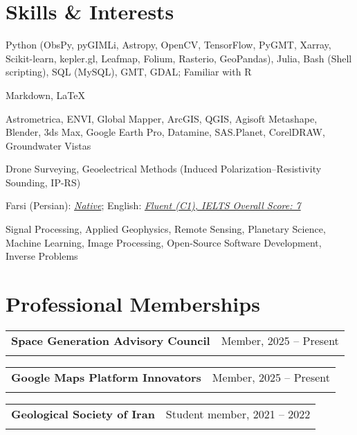 \documentclass[letterpaper,11pt]{article}
\makeatletter
\newcommand{\ressubheading}[4]{%
	\begin{tabular*}{\textwidth}{l@{\cftdotfill{\cftsecdotsep}\extracolsep{\fill}}r}
		\textbf{#1} & #2 \\
		\textit{#3} & \textit{#4} \\
	\end{tabular*}\vspace{-8pt}
}
\makeatother
\begin{document}
		\section{Skills \& Interests}
		\vspace{-0.7em}
		\begin{description}[itemsep=0pt]
			
			\item[Programming Languages:] 
			Python (ObsPy, pyGIMLi, Astropy, OpenCV, TensorFlow, PyGMT, Xarray, Scikit-learn, kepler.gl, Leafmap, Folium, Rasterio, GeoPandas), Julia, Bash (Shell scripting), SQL (MySQL), GMT, GDAL; Familiar with R
			
			\item[Markup Languages:] 
			Markdown, \LaTeX
			
			\item[Softwares:] 
			Astrometrica, ENVI, Global Mapper, ArcGIS, QGIS, Agisoft Metashape, Blender, 3ds Max, Google Earth Pro, Datamine, SAS.Planet, CorelDRAW, Groundwater Vistas
			
			\item[Field Techniques:] 
			Drone Surveying, Geoelectrical Methods (Induced Polarization–Resistivity Sounding, IP-RS)
			
			\item[Languages:] 
			Farsi (Persian): \textit{\underline{Native}}; English: \textit{\underline{Fluent (C1), IELTS Overall Score: 7}}
			
			\item[Research Interests:] 
			Signal Processing, Applied Geophysics, Remote Sensing, Planetary Science, Machine Learning, Image Processing, Open-Source Software Development, Inverse Problems
			
		\end{description}
		\vspace{-2.3em} 
		\section{Professional Memberships}
		\vspace{-0.2em}
		\vspace{-0.5em} 
		\ressubheading{Space Generation Advisory Council}{Member, 2025 – Present}{}{}
		\vspace{-0.2em} 
		\vspace{-0.5em} 
		\ressubheading{Google Maps Platform Innovators}{Member, 2025 – Present}{}{}
		\vspace{-0.2em} 
		\vspace{-0.5em} 
		\ressubheading{Geological Society of Iran}{Student member, 2021 – 2022}{}{}
		\vspace{2em} 
		
	
\end{document}

